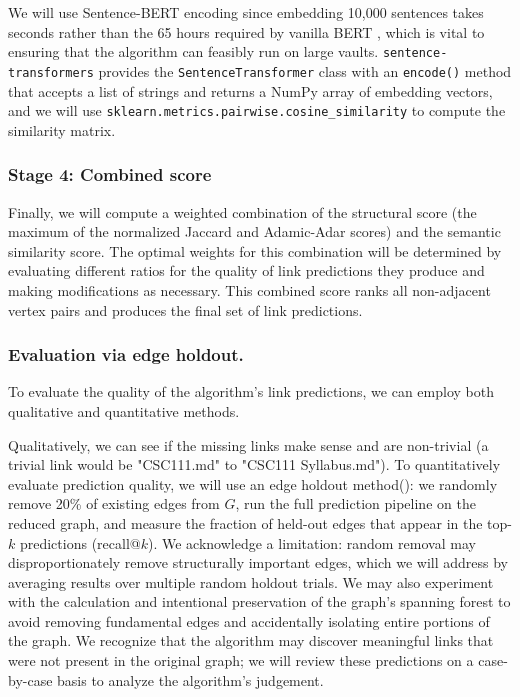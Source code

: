 \documentclass[fontsize=11pt]{article}
\begin{document}
\noindent We will use Sentence-BERT encoding since embedding 10,000 sentences takes seconds rather than the 65 hours required by vanilla BERT \cite{reimers2019}, which is vital to ensuring that the algorithm can feasibly run on large vaults. \texttt{sentence-transformers} provides the \texttt{SentenceTransformer} class with an \texttt{encode()} method that accepts a list of strings and returns a NumPy array of embedding vectors, and we will use \texttt{sklearn.metrics.pairwise.cosine\_similarity} to compute the similarity matrix.

\subsubsection*{Stage 4: Combined score}
Finally, we will compute a weighted combination of the structural score (the maximum of the normalized Jaccard and Adamic-Adar scores) and the semantic similarity score. The optimal weights for this combination will be determined by evaluating different ratios for the quality of link predictions they produce and making modifications as necessary. This combined score ranks all non-adjacent vertex pairs and produces the final set of link predictions. 

\subsubsection*{Evaluation via edge holdout.}
To evaluate the quality of the algorithm's link predictions, we can employ both qualitative and quantitative methods.

\noindent Qualitatively, we can see if the missing links make sense and are non-trivial (a trivial link would be "CSC111.md" to "CSC111 Syllabus.md"). To quantitatively evaluate prediction quality, we will use an edge holdout method(\cite{gfg_holdout}): we randomly remove 20\% of existing edges from $G$, run the full prediction pipeline on the reduced graph, and measure the fraction of held-out edges that appear in the top-$k$ predictions (recall@$k$). We acknowledge a limitation: random removal may disproportionately remove structurally important edges, which we will address by averaging results over multiple random holdout trials. We may also experiment with the calculation and intentional preservation of the graph's spanning forest to avoid removing fundamental edges and accidentally isolating entire portions of the graph. We recognize that the algorithm may discover meaningful links that were not present in the original graph; we will review these predictions on a case-by-case basis to analyze the algorithm's judgement.
\end{document}
